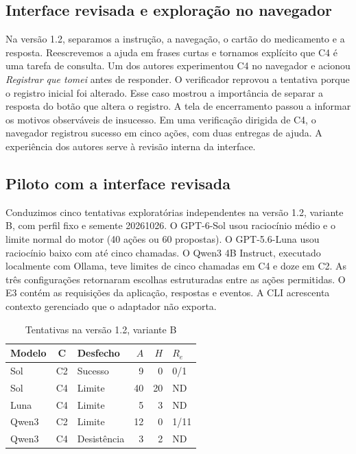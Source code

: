 \subsection{Interface revisada e exploração no navegador}
Na versão 1.2, separamos a instrução, a navegação, o cartão do medicamento e a resposta. Reescrevemos a ajuda em frases curtas e tornamos explícito que C4 é uma tarefa de consulta. Um dos autores experimentou C4 no navegador e acionou \emph{Registrar que tomei} antes de responder. O verificador reprovou a tentativa porque o registro inicial foi alterado. Esse caso mostrou a importância de separar a resposta do botão que altera o registro. A tela de encerramento passou a informar os motivos observáveis de insucesso. Em uma verificação dirigida de C4, o navegador registrou sucesso em cinco ações, com duas entregas de ajuda. A experiência dos autores serve à revisão interna da interface.

\subsection{Piloto com a interface revisada}
Conduzimos cinco tentativas exploratórias independentes na versão 1.2, variante B, com perfil fixo e semente 20261026. O GPT-6-Sol usou raciocínio médio e o limite normal do motor (40 ações ou 60 propostas). O GPT-5.6-Luna usou raciocínio baixo com até cinco chamadas. O Qwen3 4B Instruct, executado localmente com Ollama, teve limites de cinco chamadas em C4 e doze em C2. As três configurações retornaram escolhas estruturadas entre as ações permitidas. O E3 contém as requisições da aplicação, respostas e eventos. A CLI acrescenta contexto gerenciado que o adaptador não exporta.

\begin{table}[ht]
\caption{Tentativas na versão 1.2, variante B}
\small
\begin{tabularx}{\columnwidth}{@{}lcYrrl@{}}\toprule
Modelo & C & Desfecho & $A$ & $H$ & $R_e$\\\midrule
Sol & C2 & Sucesso & 9 & 0 & 0/1\\
Sol & C4 & Limite & 40 & 20 & ND\\
Luna & C4 & Limite & 5 & 3 & ND\\
Qwen3 & C2 & Limite & 12 & 0 & 1/11\\
Qwen3 & C4 & Desistência & 3 & 2 & ND\\\bottomrule
\end{tabularx}
\end{table}

